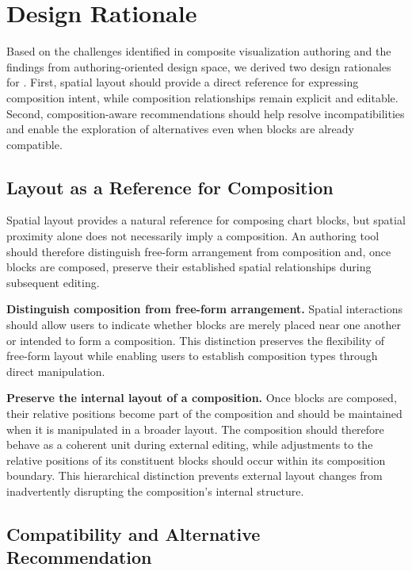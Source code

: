 \section{Design Rationale}
\label{sec:design-rationale}

Based on the challenges identified in composite visualization authoring and the
findings from authoring-oriented design space, we derived two design rationales for
{\system}. First, spatial layout should provide a direct reference for
expressing composition intent, while composition relationships remain explicit
and editable. Second, composition-aware
recommendations should help resolve incompatibilities and enable the exploration
of alternatives even when blocks are already compatible.


\subsection{Layout as a Reference for Composition}
\label{sec:layout-composition}

Spatial layout provides a natural reference for composing chart blocks, but
spatial proximity alone does not necessarily imply a composition. An authoring
tool should therefore distinguish free-form arrangement from composition and,
once blocks are composed, preserve their established spatial relationships
during subsequent editing.

\textbf{Distinguish composition from free-form arrangement.}
Spatial interactions should allow users to indicate whether blocks are merely
placed near one another or intended to form a composition. This distinction
preserves the flexibility of free-form layout while enabling users to establish
composition types through direct manipulation.

\textbf{Preserve the internal layout of a composition.}
Once blocks are composed, their relative positions become part of the
composition and should be maintained when it is manipulated in a broader
layout. The composition should therefore behave as a coherent unit during
external editing, while adjustments to the relative positions of its
constituent blocks should occur within its composition boundary. This
hierarchical distinction prevents external layout changes from inadvertently
disrupting the composition's internal structure.

\subsection{Compatibility and Alternative Recommendation}
\label{sec:compatibility-recommendation}

